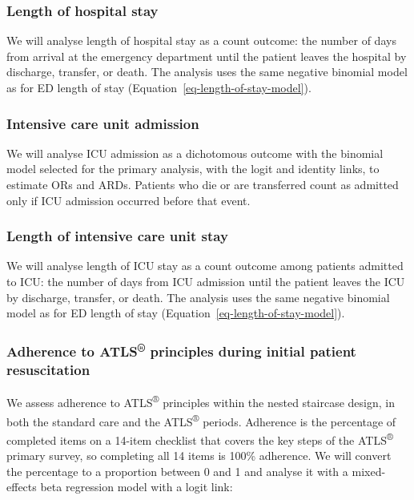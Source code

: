 \documentclass[
]{scrartcl}
\begin{document}
\subsubsection{Length of hospital
stay}\label{sec-length-of-hospital-stay}

We will analyse length of hospital stay as a count outcome: the number
of days from arrival at the emergency department until the patient
leaves the hospital by discharge, transfer, or death. The analysis uses
the same negative binomial model as for ED length of stay
(Equation~\ref{eq-length-of-stay-model}).

\subsubsection{Intensive care unit
admission}\label{sec-intensive-care-unit-admission}

We will analyse ICU admission as a dichotomous outcome with the binomial
model selected for the primary analysis, with the logit and identity
links, to estimate ORs and ARDs. Patients who die or are transferred
count as admitted only if ICU admission occurred before that event.

\subsubsection{Length of intensive care unit
stay}\label{sec-length-of-intensive-care-unit-stay}

We will analyse length of ICU stay as a count outcome among patients
admitted to ICU: the number of days from ICU admission until the patient
leaves the ICU by discharge, transfer, or death. The analysis uses the
same negative binomial model as for ED length of stay
(Equation~\ref{eq-length-of-stay-model}).

\subsubsection{\texorpdfstring{Adherence to ATLS\textsuperscript{®}
principles during initial patient
resuscitation}{Adherence to ATLS® principles during initial patient resuscitation}}\label{sec-adherence-to-atls-principles-during-initial-patient-resuscitation}

We assess adherence to ATLS\textsuperscript{®} principles within the
nested staircase design, in both the standard care and the
ATLS\textsuperscript{®} periods. Adherence is the percentage of
completed items on a 14-item checklist that covers the key steps of the
ATLS\textsuperscript{®} primary survey, so completing all 14 items is
100\% adherence. We will convert the percentage to a proportion between
0 and 1 and analyse it with a mixed-effects beta regression model with a
logit link:
\end{document}
